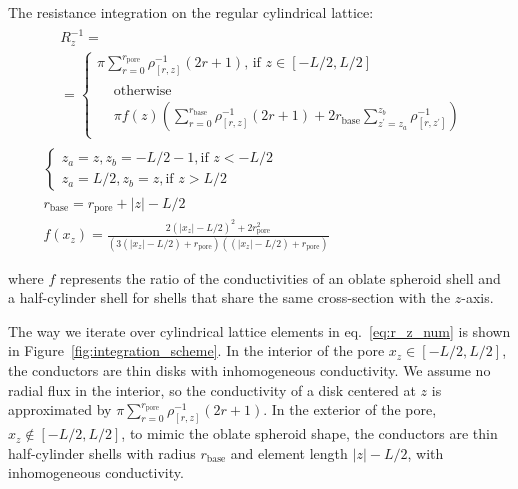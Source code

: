 \documentclass[10pt, a4paper]{article}
\begin{document}
\begin{multicols}{2}
The resistance integration on the regular cylindrical lattice:
\begin{gather}
    \label{eq:r_z_num}
    \begin{aligned} 
        &R_z^{-1} =
        \\
        &=\begin{cases}
             \pi \sum_{r=0}^{r_{\textrm{pore}}} \rho^{-1}_{[r,z]} (2r+1) \textrm{, if } z\in[-L/2,L/2]
             \\[4pt]
             \begin{aligned}
                &\textrm{otherwise}
                \\
                &\pi f(z) \left(\sum_{r=0}^{r_{\textrm{base}}} \rho^{-1}_{[r,z]} (2r+1) + 2 r_{\textrm{base}} \sum_{z^{\prime} = z_{a}}^{z_{b}}\rho^{-1}_{[r,z^{\prime}]}\right)
             \end{aligned}
        \end{cases}
    \end{aligned}
    \\
    \begin{cases}
        z_{a} = z, z_{b} = -L/2-1, \textrm{if } z < -L/2
        \\
        z_{a} = L/2, z_{b} = z, \textrm{if } z > L/2
    \end{cases}
    \\
    \label{eq:r_base}
    r_{\textrm{base}} = r_{\textrm{pore}} + |z| - L/2
    \\
    \label{eq:prefactor}
    f(x_z) = \frac{2(|x_z|-L/2)^2 + 2r_{\textrm{pore}}^2}{(3(|x_z|-L/2)+r_{\textrm{pore}})((|x_z|-L/2)+r_{\textrm{pore}})}
\end{gather}

where $f$ represents the ratio of the conductivities of an oblate spheroid shell and a half-cylinder shell for shells that share the same cross-section with the $z$-axis.

The way we iterate over cylindrical lattice elements in eq.~\ref{eq:r_z_num} is shown in Figure~\ref{fig:integration_scheme}.
In the interior of the pore $x_z \in [-L/2, L/2]$, the conductors are thin disks with inhomogeneous conductivity.
We assume no radial flux in the interior, so the conductivity of a disk centered at $z$ is approximated by $\pi \sum_{r=0}^{r_{\textrm{pore}}} \rho^{-1}_{[r,z]} (2r + 1)$.
In the exterior of the pore, $x_z \notin [-L/2, L/2]$, to mimic the oblate spheroid shape, the conductors are thin half-cylinder shells with radius $r_{\textrm{base}}$ and element length $|z| - L/2$, with inhomogeneous conductivity.


\end{multicols}
\end{document}
